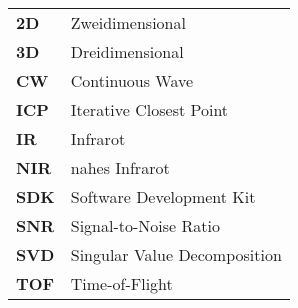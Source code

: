 \documentclass[thesis.tex]{subfiles}
\begin{document}

\begin{tabular}{ l l }
\textbf{2D} & Zweidimensional \\
\textbf{3D} & Dreidimensional \\
\textbf{CW} & Continuous Wave \\
\textbf{ICP} & Iterative Closest Point \\
\textbf{IR} & Infrarot \\
\textbf{NIR} & nahes Infrarot \\
\textbf{SDK} & Software Development Kit \\
\textbf{SNR} & Signal-to-Noise Ratio \\
\textbf{SVD} & Singular Value Decomposition \\
\textbf{TOF} & Time-of-Flight \\
\end{tabular}
\end{document}
